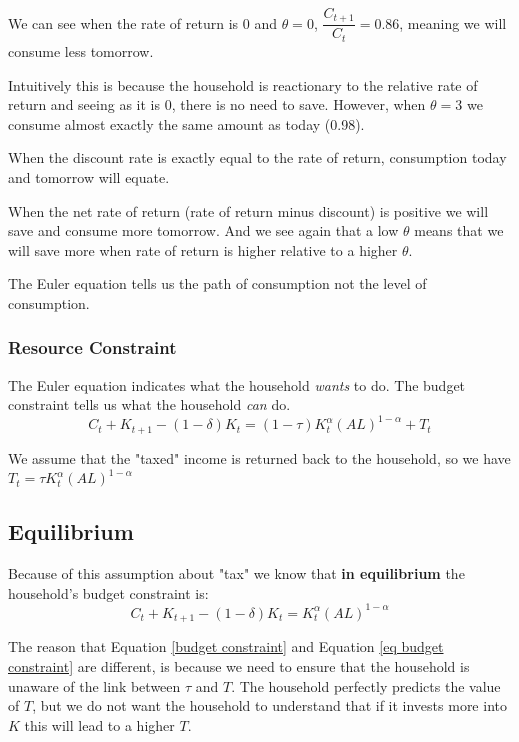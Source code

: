\documentclass[11pt]{article}
\begin{document}
We can see when the rate of return is 0 and $\theta = 0$, $\dfrac{C_{t+1}}{C_t}=0.86$, meaning we will consume less  tomorrow. 
\begin{mdframed}
\begin{intu}
    Intuitively this is because the household is reactionary to the relative rate of return and seeing as it is 0, there is no need to save. However, when $\theta=3$ we consume almost exactly the same amount as today (0.98).

When the discount rate is exactly equal to the rate of return, consumption today and tomorrow will equate.

When the net rate of return (rate of return minus discount) is positive we will save and consume more tomorrow. And we see again that a low $\theta$ means that we will save more when rate of return is higher relative to a higher $\theta$.
\end{intu}
\end{mdframed}

The Euler equation tells us the path of consumption not the level of consumption.

\subsubsection{Resource Constraint}

The Euler equation indicates what the household \textit{wants} to do. The budget constraint tells us what the household \textit{can} do.
\begin{equation}
    \label{budget constraint}
    C_t + K_{t+1} - (1-\delta)K_t = (1-\tau)K_t^\alpha (AL)^{1-\alpha} + T_t
\end{equation}

We assume that the "taxed" income is returned back to the household, so we have $T_t = \tau K_t^\alpha(AL)^{1-\alpha}$

\subsection{Equilibrium}

Because of this assumption about "tax" we know that \textbf{in equilibrium} the household's budget constraint is:
\begin{equation}
    \label{eq budget constraint}
    C_t + K_{t+1} - (1-\delta)K_t = K_t^\alpha(AL)^{1-\alpha}
\end{equation}

\begin{note}
    The reason that Equation \eqref{budget constraint} and Equation \eqref{eq budget constraint} are different, is because we need to ensure that the household is unaware of the link between $\tau$ and $T$. The household perfectly predicts the value of $T$, but we do not want the household to understand that if it invests more into $K$ this will lead to a higher $T$.
\end{note}
\end{document}
